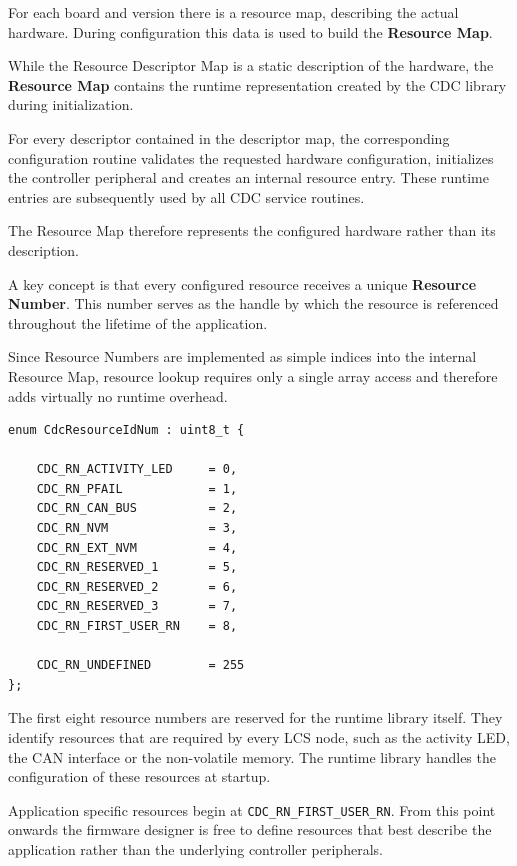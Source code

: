 For each board and version there is a resource map, describing the actual hardware.
 During configuration this data is used to build the \textbf{Resource Map}. 


While the Resource Descriptor Map is a static description of the hardware, the
\textbf{Resource Map} contains the runtime representation created by the CDC
library during initialization.

For every descriptor contained in the descriptor map, the corresponding
configuration routine validates the requested hardware configuration, initializes
the controller peripheral and creates an internal resource entry. These runtime
entries are subsequently used by all CDC service routines.

The Resource Map therefore represents the configured hardware rather than its
description.

A key concept is that every configured resource receives a unique
\textbf{Resource Number}. This number serves as the handle by which the resource
is referenced throughout the lifetime of the application.

Since Resource Numbers are implemented as simple indices into the internal
Resource Map, resource lookup requires only a single array access and therefore
adds virtually no runtime overhead.

\lstset{language=c++, style=api-interface}
\begin{lstlisting}
enum CdcResourceIdNum : uint8_t {

    CDC_RN_ACTIVITY_LED     = 0,
    CDC_RN_PFAIL            = 1,
    CDC_RN_CAN_BUS          = 2,
    CDC_RN_NVM              = 3,
    CDC_RN_EXT_NVM          = 4,
    CDC_RN_RESERVED_1       = 5,
    CDC_RN_RESERVED_2       = 6,
    CDC_RN_RESERVED_3       = 7,
    CDC_RN_FIRST_USER_RN    = 8, 

    CDC_RN_UNDEFINED        = 255
};
\end{lstlisting}
\FloatBarrier

The first eight resource numbers are reserved for the runtime library itself. They
identify resources that are required by every LCS node, such as the activity
LED, the CAN interface or the non-volatile memory.
The runtime library handles the configuration of these resources at startup.

Application specific resources begin at
\texttt{CDC\_RN\_FIRST\_USER\_RN}. From this point onwards the firmware designer
is free to define resources that best describe the application rather than the
underlying controller peripherals.

